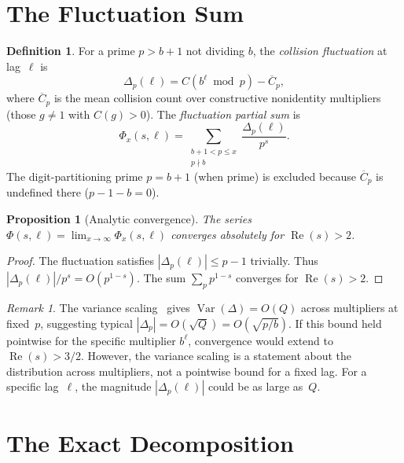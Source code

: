 \documentclass[12pt]{amsart}
\newtheorem{proposition}[theorem]{Proposition}
\theoremstyle{definition}
\newtheorem{definition}[theorem]{Definition}
\theoremstyle{remark}
\newtheorem{remark}[theorem]{Remark}
\begin{document}
\section{The Fluctuation Sum}

\begin{definition}
For a prime $p > b + 1$ not dividing $b$, the \emph{collision
fluctuation} at lag~$\ell$ is
\[
\Delta_p(\ell) = C(b^{\ell} \bmod p) - \overline{C}_p,
\]
where $\overline{C}_p$ is the mean collision count over
constructive nonidentity multipliers (those $g \ne 1$ with
$C(g) > 0$). The \emph{fluctuation partial sum} is
\[
\Phi_x(s, \ell) = \sum_{\substack{b+1 < p \le x \\ p \nmid b}}
\frac{\Delta_p(\ell)}{p^s}.
\]
The digit-partitioning prime $p = b + 1$ (when prime) is
excluded because $\overline{C}_p$ is undefined there
($p - 1 - b = 0$).
\end{definition}

\begin{proposition}[Analytic convergence]\label{prop:convergence}
The series $\Phi(s, \ell) = \lim_{x \to \infty} \Phi_x(s, \ell)$
converges absolutely for $\operatorname{Re}(s) > 2$.
\end{proposition}

\begin{proof}
The fluctuation satisfies $|\Delta_p(\ell)| \le p - 1$
trivially. Thus $|\Delta_p(\ell)|/p^s = O(p^{1 - s})$.
The sum $\sum_p p^{1 - s}$ converges for
$\operatorname{Re}(s) > 2$.
\end{proof}

\begin{remark}
The variance scaling~\cite{paper12} gives
$\operatorname{Var}(\Delta) = O(Q)$ across multipliers
at fixed~$p$, suggesting typical $|\Delta_p| = O(\sqrt{Q})
= O(\sqrt{p/b})$. If this bound held pointwise for the
specific multiplier $b^{\ell}$, convergence would extend to
$\operatorname{Re}(s) > 3/2$. However, the variance scaling
is a statement about the distribution across multipliers,
not a pointwise bound for a fixed lag. For a specific
lag~$\ell$, the magnitude $|\Delta_p(\ell)|$ could be as
large as~$Q$.
\end{remark}

\section{The Exact Decomposition}
\end{document}

